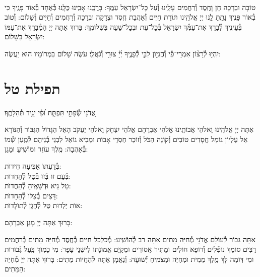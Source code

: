\documentclass[twoside, openany, parskip=half, 11pt]{book}
\begin{document}
\shatz\\
טוֹבָה וּבְרָכָה חֵן וָחֶֽסֶד וְ֯רַחֲמִים עָלֵֽינוּ וְ֯עַל כׇּל־יִשְׂרָאֵל עַמֶּֽךָ: בָּרֲכֵֽנוּ אָבִֽינוּ כֻּלָּֽנוּ כְּ֯אֶחָד בְּ֯אוֹר פָּנֶֽיךָ כִּי בְ֯אוֹר פָּנֶֽיךָ נָתַֽתָּ לָֽנוּ יְיָ אֱלֹהֵֽינוּ תּוֹרַת חַיִּים וְ֯אַהֲבַת חֶֽסֶד וּצְדָקָה וּבְרָכָה וְ֯רַחֲמִים וְ֯חַיִּים וְ֯שָׁלוֹם: וְ֯טוֹב בְּ֯עֵינֶֽיךָ לְ֯בָרֵךְ אֶת־עַמְּ֯ךָ יִשְׂרָאֵל בְּ֯כׇל־עֵת וּבְכׇל־שָׁעָה בִּשְׁלוֹמֶֽךָ: בָּרוּךְ אַתָּה יְיָ הַמְ֯בָרֵךְ אֶת־עַמּוֹ יִשְׂרָאֵל בַּשָּׁלוֹם:

יִֽהְי֥וּ לְ֯רָצ֨וֹן אִמְרֵי־פִ֡י וְ֯הֶגְי֣וֹן לִבִּ֣י לְ֯פָנֶ֑יךָ יְ֜יָ֗ צוּרִ֥י וְ֯גֹֽאֲלִֽי׃ עֹשֶׂה שָׁלוֹם בִּמְרוֹמָיו הוּא יַעֲשֶׂה:

\vfill
{}


\sepline

\clearpage

\section[תפילת טל]{ תפילת טל }
\label{tefilastal}


\begin{small}
אֲ֭דֹנָי שְׂ֯פָתַ֣י תִּפְתָּ֑ח וּ֝פִ֗י יַגִּ֥יד תְּ֯הִלָּתֶֽךָ׃
\\
\end{small}
אַתָּה יְיָ אֱלֹהֵֽינוּ וֵאלֹהֵי אֲבוֹתֵֽינוּ אֱלֹהֵי אַבְרָהָם אֱלֹהֵי יִצְחָק וֵאלֹהֵי יַעֲקֹב הָאֵל הַגָּדוֹל הַגִּבּוֹר וְ֯הַנּוֹרָא אֵל עֶלְיוֹן גּוֹמֵל חֲסָדִים טוֹבִים וְ֯קוֹנֵה הַכֹּל וְ֯זוֹכֵר חַסְדֵי אָבוֹת וּמֵבִיא גוֹאֵל לִבְנֵי בְ֯נֵיהֶם לְ֯מַֽעַן שְׁ֯מוֹ בְּ֯אַהֲבָה: מֶֽלֶךְ עוֹזֵר וּמוֹשִֽׁיעַ וּמָגֵן:


\begin{large}
בְּ֯דַעְתּוׂ אַבִּיעָה חִידוׂת: \\
בְּ֯עַם זוּ בְּ֯זוּ בְּ֯טַל לְ֯הַחֲדוׂת:\\
טַל גֵּיא וּדְשָׁאֶֽיהָ לְ֯הַחֲדוׂת: \\
דָּצִים בְּ֯צִלּוׂ לְ֯הֵחָדוׂת:\\
אוׂת יַלְדוּת טַל לְ֯הָגֵן לְ֯תוׂלָדוׂת:

\end{large}


בָּרוּךְ אַתָּה יְיָ מָגֵן אַבְרָהָם:

אַתָּה גִּבּוֹר לְ֯עוֹלָם אֲדֹנָי מְ֯חַיֵּה מֵתִים אַתָּה רַב לְ֯הוֹשִֽׁיעַ: מְ֯כַלְכֵּל חַיִּים בְּ֯חֶֽסֶד מְ֯חַיֵּה מֵתִים בְּ֯רַחֲמִים רַבִּים סוֹמֵךְ נוֹפְ֯לִים וְ֯רוֹפֵא חוֹלִים וּמַתִּיר אֲסוּרִים וּמְקַיֵּם אֱמוּנָתוֹ לִישֵׁנֵי עָפָר: מִי כָמֽוֹךָ בַּֽעַל גְּ֯בוּרוֹת וּמִי דּֽוֹמֶה לָּךְ מֶֽלֶךְ מֵמִית וּמְחַיֶּה וּמַצְמִֽיחַ יְ֯שׁוּעָה: וְ֯נֶאֱמָן אַתָּה לְ֯הַחֲיוֹת מֵתִים: בָּרוּךְ אַתָּה יְיָ מְ֯חַיֵּה הַמֵּתִים:
\end{document}
